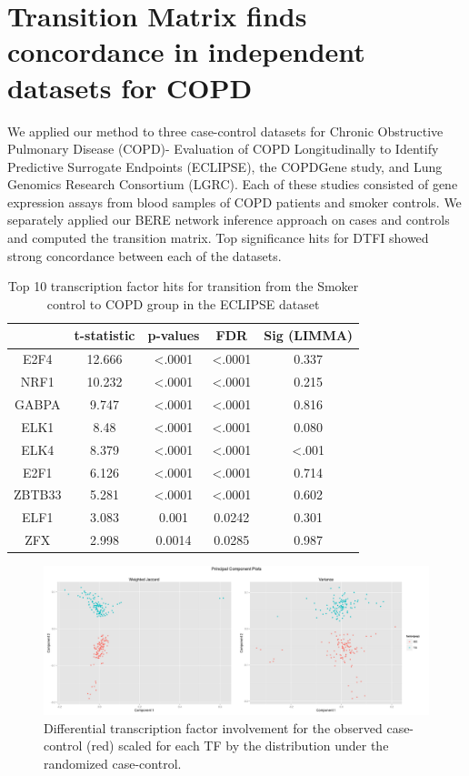 \documentclass[english]{article}
\providecommand{\tabularnewline}{\\}
\begin{document}
\section*{Transition Matrix finds concordance in independent datasets for COPD }

We applied our method to three case-control datasets for Chronic Obstructive
Pulmonary Disease (COPD)- Evaluation of COPD Longitudinally to Identify
Predictive Surrogate Endpoints (ECLIPSE), the COPDGene study, and
Lung Genomics Research Consortium (LGRC). Each of these studies consisted
of gene expression assays from blood samples of COPD patients and
smoker controls. We separately applied our BERE network inference
approach on cases and controls and computed the transition matrix.
Top significance hits for DTFI showed strong concordance between each
of the datasets. 

\begin{table}
\begin{tabular}{|c|c|c|c|c|}
\hline 
 & t-statistic & p-values & FDR & Sig (LIMMA)\tabularnewline
\hline 
\hline 
E2F4 & 12.666 & <.0001 & <.0001 & 0.337\tabularnewline
\hline 
NRF1 & 10.232 & <.0001 & <.0001 & 0.215\tabularnewline
\hline 
GABPA & 9.747 & <.0001 & <.0001 & 0.816\tabularnewline
\hline 
ELK1 & 8.48 & <.0001 & <.0001 & 0.080\tabularnewline
\hline 
ELK4 & 8.379 & <.0001 & <.0001 & <.001\tabularnewline
\hline 
E2F1 & 6.126 & <.0001 & <.0001 & 0.714\tabularnewline
\hline 
ZBTB33 & 5.281 & <.0001 & <.0001 & 0.602\tabularnewline
\hline 
ELF1 & 3.083 & 0.001 & 0.0242 & 0.301\tabularnewline
\hline 
ZFX & 2.998 & 0.0014 & 0.0285 & 0.987\tabularnewline
\hline 
\end{tabular}\caption{Top 10 transcription factor hits for transition from the Smoker control
to COPD group in the ECLIPSE dataset}
\end{table}


\begin{figure}[h]
\includegraphics[width=1\columnwidth]{pasted6}

\caption{Differential transcription factor involvement for the observed case-control
(red) scaled for each TF by the distribution under the randomized
case-control. }
\end{figure}
\end{document}

